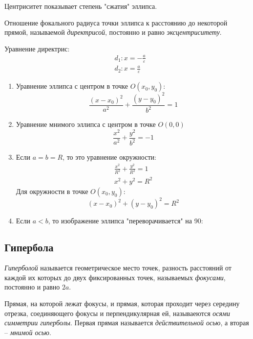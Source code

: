 Центриситет показывает степень "сжатия" эллипса.

Отношение фокального радиуса точки эллипса к расстоянию до некоторой прямой, называемой \textit{директрисой}, постоянно и равно \textit{эксцентриситету}. 

Уравнение директрис:
\begin{align*}
  &d_1: x = -\frac{a}{\varepsilon} \\
  &d_2: x = \frac{a}{\varepsilon}
\end{align*}

\begin{note}
  \begin{center}
    \begin{enumerate}
      \item Уравнение эллипса с центром в точке $O(x_0, y_0)$: \[
        \frac{(x - x_0)^2}{a^2} + \frac{(y - y_0)^2}{b^2} = 1
        \]

      \item Уравнение мнимого эллипса с центром в точке $O(0, 0)$ \[
        \frac{x^2}{a^2} + \frac{y^2}{b^2} = -1
      \]  

      \item Если $a = b = R$, то это уравнение окружности:
        \begin{gather*}
          \frac{x^2}{R^2} + \frac{y^2}{R^2} = 1 \\
          x^2 + y^2 = R^2
        \end{gather*}
        Для окружности в точке $O(x_0, y_0)$: \[
          (x - x_0)^2 + (y - y_0)^2 = R^2
        \]

      \item Если $a < b$, то изображение эллипса "переворачивается" на 90:
  \end{enumerate} 
  \end{center}
\end{note}

\subsection{Гипербола}

\begin{definition}
  \textit{Гиперболой} называется геометрическое место точек, разность расстояний от каждой их которых до двух фиксированных точек, называемых \textit{фокусами}, постоянно и равно $2a$.
\end{definition}

Прямая, на которой лежат фокусы, и прямая, которая проходит через середину отрезка, соединяющего фокусы и перпендикулярная ей, называеются \textit{осями симметрии гиперболы}. 
Первая прямая называется \textit{действительной осью}, а вторая -- \textit{мнимой осью}.

